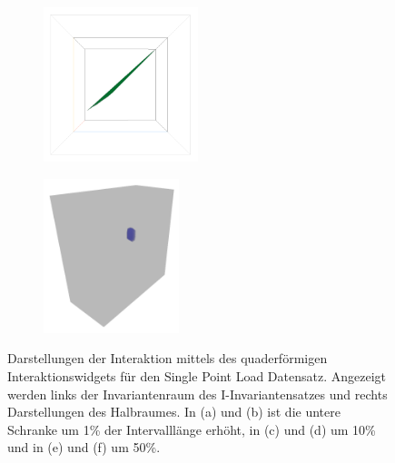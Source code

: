 \documentclass[a4paper,fontsize=12pt,toc=bib,parskip=half,ngerman]{scrartcl}
\begin{document}
\begin{figure}
\begin{subfigure}{0.49\textwidth}
		\subcaption{}
		\label{SinglePointObject2}
	\end{subfigure}
	\medskip
	\begin{subfigure}{0.49\textwidth}
		\centering
		\includegraphics[height=4.5cm]{pictures/results/SinglePoint/SinglePoint_InvariantSpace3.png}
		\subcaption{}
		\label{SinglePointInvariant3}
	\end{subfigure}
	\hspace*{\fill}
	\begin{subfigure}{0.49\textwidth}
		\centering
		\includegraphics[height=4.5cm]{pictures/results/SinglePoint/SinglePoint_Object3.png}
		\subcaption{}
		\label{SinglePointObject3}
	\end{subfigure}
	\caption{Darstellungen der Interaktion mittels des quaderf\"ormigen Interaktionswidgets f\"ur den Single Point Load Datensatz. Angezeigt werden links der Invariantenraum des I-Invariantensatzes und rechts Darstellungen des Halbraumes. In (a) und (b) ist die untere Schranke um 1\% der Intervalll\"ange erh\"oht, in (c) und (d) um 10\% und in (e) und (f) um 50\%.}
	\label{SinglePointInteraction}
\end{figure}
\end{document}
